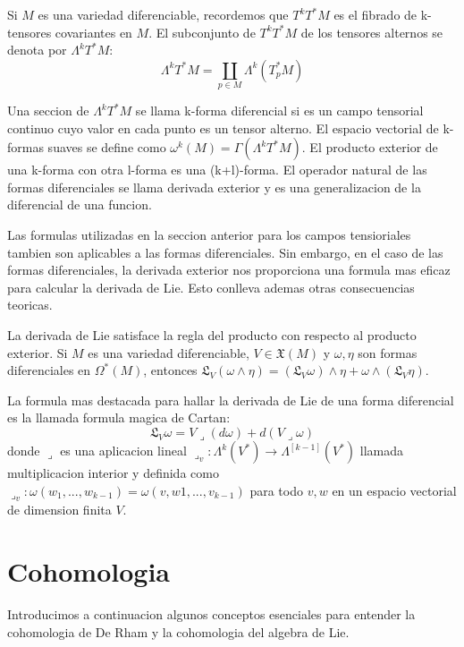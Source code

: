 \documentclass[12pt]{extarticle}
\newcommand{\<}{\langle}
\renewcommand{\>}{\rangle}
\theoremstyle{definition}
\begin{document}
Si $M$ es una variedad diferenciable, recordemos que $T^kT^*M$ es el fibrado de
k-tensores covariantes en $M$. El subconjunto de $T^kT^*M$ de los tensores
alternos se denota por $\Lambda^k T^*M$:
\begin{equation*}
	\Lambda^k T^*M = \coprod_{p\in M} \Lambda^k(T^*_pM)
\end{equation*}

Una seccion de $\Lambda^kT^*M$ se llama k-forma diferencial si es un campo
tensorial continuo cuyo valor en cada punto es un tensor alterno. El espacio
vectorial de k-formas suaves se define como $\omega^k(M) = \Gamma (\Lambda ^k
T^*M)$. El producto exterior de una k-forma con otra l-forma es una (k+l)-forma.
El operador natural de las formas diferenciales se llama derivada exterior y es
una generalizacion de la diferencial de una funcion.

Las formulas utilizadas en la seccion anterior para los campos tensioriales
tambien son aplicables a las formas diferenciales. Sin embargo, en el caso de
las formas diferenciales, la derivada exterior nos proporciona una formula
mas eficaz para calcular la derivada de Lie. Esto conlleva ademas otras
consecuencias teoricas.

La derivada de Lie satisface la regla del producto con respecto al producto
exterior. Si $M$ es una variedad diferenciable, $V \in \mathfrak{X}(M)$ y
$\omega, \eta$ son formas diferenciales en $\Omega^*(M)$, entonces
$\mathfrak{L}_V(\omega \wedge \eta) = (\mathfrak{L}_V\omega) \wedge \eta +
\omega \wedge (\mathfrak{L}_V\eta)$.

La formula mas destacada para hallar la derivada de Lie de una forma diferencial
es la llamada formula magica de Cartan:
\begin{equation*}
	\mathfrak{L}_V\omega = V \lrcorner (d\omega) + d(V \lrcorner \omega)
\end{equation*}
donde $\lrcorner$ es una aplicacion lineal $\lrcorner_v : \Lambda ^k (V^*)
\rightarrow \Lambda^{[k-1]} (V^*)$ llamada multiplicacion interior y definida como
$\lrcorner_v: \omega(w_1,...,w_{k-1}) = \omega(v, w1, ..., v_{k-1})$ para todo
$v, w$ en un espacio vectorial de dimension finita $V$.

\section{Cohomologia}

Introducimos a continuacion algunos conceptos esenciales para entender la cohomologia de De
Rham y la cohomologia del algebra de Lie.
\end{document}
